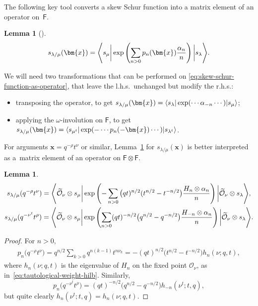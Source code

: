 \documentclass[10pt,a4paper]{amsart}
\numberwithin{equation}{section}
\newtheorem{Lemma}[Theorem]{Lemma}
\renewcommand{\vec}[1]{\bm{#1}}
\renewcommand{\tilde}[1]{\widetilde{#1}}
\newcommand{\cO}{\mathcal{O}}
\newcommand{\sF}{\mathsf{F}}
\DeclarePairedDelimiter{\inner}{\langle}{\rangle}
\begin{document}
\begin{MyParagraph}
The following key tool converts a skew Schur function into a matrix
element of an operator on~$\sF$.

\begin{Lemma}[{\cite[Chapter~14]{Kac1990}}] \label{lem:skew-schur-function-as-operator}
 \begin{equation} \label{eq:skew-schur-function-as-operator}
 s_{\lambda/\mu}(\vec x) = \inner*{s_\mu \bigg| \exp\left(\sum_{n > 0} p_n(\vec x) \frac{\alpha_n}{n}\right) \bigg| s_\lambda}.
 \end{equation}
\end{Lemma}

We will need two transformations that can be performed on
\eqref{eq:skew-schur-function-as-operator}, that leave the l.h.s.\
unchanged but modify the r.h.s.:
\begin{itemize}\itemsep=0pt
\item transposing the operator, to get $s_{\lambda/\mu}(\vec x) =
 \inner*{s_\lambda | \exp(\cdots \alpha_{-n} \cdots) | s_\mu}$;
\item applying the $\omega$-involution on $\sF$, to get
 $s_{\lambda/\mu}(\vec x) = \inner*{s_{\mu^t} | \exp(-\cdots p_n(-\vec x)
 \cdots) | s_{\lambda^t}}$.
\end{itemize}
\end{MyParagraph}

\begin{MyParagraph}
For arguments $\vec x = q^{-\rho} t^\nu$ or similar,
Lemma~\ref{lem:skew-schur-function-as-operator} for
$s_{\lambda/\mu}(\vec x)$ is better interpreted as a~matrix element of
an operator on $\sF \otimes \sF$.

\begin{Lemma} \label{lem:skew-schur-function-as-operator-2}
 \begin{gather*}
 s_{\lambda/\mu}(q^{-\rho} t^{\nu}) = \inner*{\tilde\cO_\nu \otimes s_\mu \bigg| \exp\left(-\sum_{n > 0} \big(qt)^{n/2} (t^{n/2} - t^{-n/2}\big) \frac{H_n \otimes \alpha_n}{n}\right) \bigg| \tilde\cO_\nu \otimes s_\lambda}, \\
 s_{\lambda/\mu}(q^{-\nu^t} t^\rho) = \inner*{\tilde\cO_\nu \otimes s_\mu \bigg| \exp\left(\sum_{n > 0} (qt)^{-n/2} \big(q^{n/2} - q^{-n/2}\big) \frac{H_{-n} \otimes \alpha_n}{n}\right) \bigg| \tilde\cO_\nu \otimes s_\lambda}.
 \end{gather*}
\end{Lemma}

\begin{proof}
 For $n > 0$,
 \begin{gather*}
 p_n\big(q^{-\rho} t^{\nu}\big) = q^{n/2} \sum_{k>0} q^{n(k-1)} t^{n\nu_k} = -(qt)^{n/2} \big(t^{n/2} - t^{-n/2}\big) h_n(\nu;q,t),
 \end{gather*}
 where $h_n(\nu; q,t)$ is the eigenvalue of $H_n$ on the fixed point
 $\cO_\nu$, as in~\eqref{eq:tautological-weight-hilb}. Similarly,
 \[ p_n\big(q^{-\nu^t} t^\rho\big) = (qt)^{-n/2} \big(q^{n/2} - q^{-n/2}\big) h_{-n}(\nu^t;t,q), \]
 but quite clearly $h_n(\nu^t;t,q) = h_n(\nu;q,t)$.
\end{proof}
\end{MyParagraph}
\end{document}

